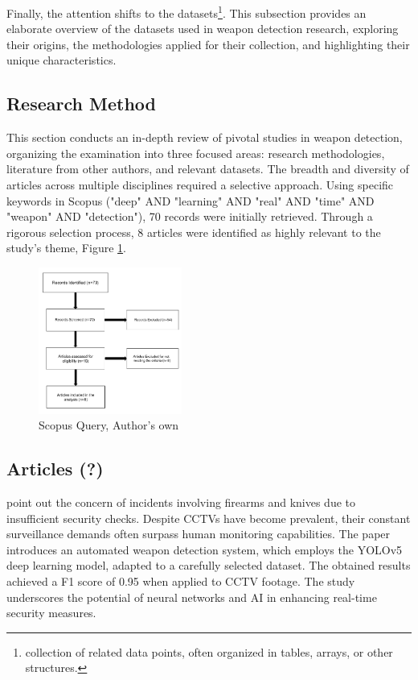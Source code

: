 Finally, the attention shifts to the datasets\footnote{collection of related data points, often organized in tables, arrays, or other structures.}. This subsection provides an elaborate overview of the datasets used in weapon detection research, exploring their origins, the methodologies applied for their collection, and highlighting their unique characteristics.

\subsection{Research Method}
This section conducts an in-depth review of pivotal studies in weapon detection, organizing the examination into three focused areas: research methodologies, literature from other authors, and relevant datasets. The breadth and diversity of articles across multiple disciplines required a selective approach. Using specific keywords in Scopus ("deep" AND "learning" AND "real" AND "time" AND "weapon" AND "detection"), 70 records were initially retrieved. Through a rigorous selection process, 8 articles were identified as highly relevant to the study's theme, Figure \ref{fig:scopus_query}.
\begin{figure}[h]
    \centering 
    \includegraphics[width=0.42\textwidth]{figs/scopus.png} 
    \caption{Scopus Query, Author's own}
    \label{fig:scopus_query}
\end{figure}

\subsection{Articles (?)}
\citet{rfc3} point out the concern of incidents involving firearms and knives due to insufficient security checks. Despite CCTVs have become prevalent, their constant surveillance demands often surpass human monitoring capabilities. The paper introduces an automated weapon detection system, which employs the YOLOv5 deep learning model, adapted to a carefully selected dataset. The obtained results achieved a F1 score of 0.95 when applied to CCTV footage. The study underscores the potential of neural networks and AI in enhancing real-time security measures.

